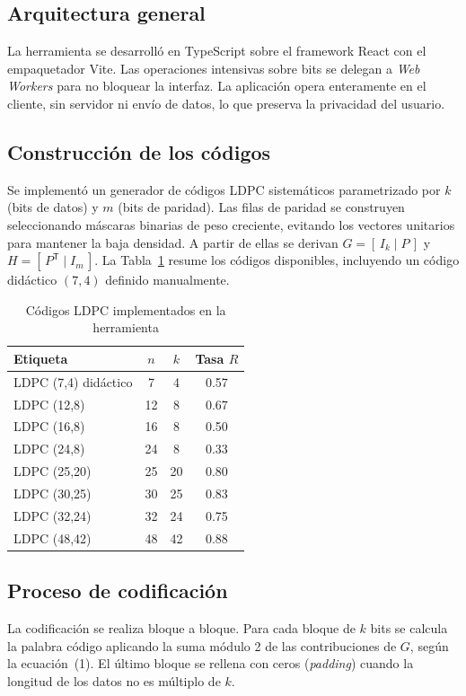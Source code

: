 \documentclass[conference]{IEEEtran}
\begin{document}
\subsection{Arquitectura general}
La herramienta se desarrolló en TypeScript sobre el framework React con el empaquetador Vite. Las operaciones intensivas sobre bits se delegan a \emph{Web Workers} para no bloquear la interfaz. La aplicación opera enteramente en el cliente, sin servidor ni envío de datos, lo que preserva la privacidad del usuario.

\subsection{Construcción de los códigos}
Se implementó un generador de códigos LDPC sistemáticos parametrizado por $k$ (bits de datos) y $m$ (bits de paridad). Las filas de paridad se construyen seleccionando máscaras binarias de peso creciente, evitando los vectores unitarios para mantener la baja densidad. A partir de ellas se derivan $G = [\,I_k \mid P\,]$ y $H = [\,P^{\mathsf{T}} \mid I_m\,]$. La Tabla~\ref{tab:codigos} resume los códigos disponibles, incluyendo un código didáctico $(7,4)$ definido manualmente.

\begin{table}[!t]
\caption{Códigos LDPC implementados en la herramienta}
\label{tab:codigos}
\centering
\begin{tabular}{lccc}
\toprule
\textbf{Etiqueta} & \textbf{$n$} & \textbf{$k$} & \textbf{Tasa $R$} \\
\midrule
LDPC (7,4) didáctico & 7  & 4  & 0.57 \\
LDPC (12,8)          & 12 & 8  & 0.67 \\
LDPC (16,8)          & 16 & 8  & 0.50 \\
LDPC (24,8)          & 24 & 8  & 0.33 \\
LDPC (25,20)         & 25 & 20 & 0.80 \\
LDPC (30,25)         & 30 & 25 & 0.83 \\
LDPC (32,24)         & 32 & 24 & 0.75 \\
LDPC (48,42)         & 48 & 42 & 0.88 \\
\bottomrule
\end{tabular}
\end{table}

\subsection{Proceso de codificación}
La codificación se realiza bloque a bloque. Para cada bloque de $k$ bits se calcula la palabra código aplicando la suma módulo 2 de las contribuciones de $G$, según la ecuación~(1). El último bloque se rellena con ceros (\emph{padding}) cuando la longitud de los datos no es múltiplo de $k$.
\end{document}
